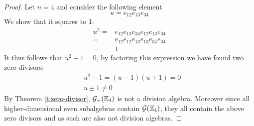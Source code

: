 \begin{proof}
	Let $n = 4$ and consider the following element
	\[u = e_{12}e_{13}e_{34}\]
	We show that it squares to $1$:
	\begin{align*}
		u^2 = &e_{12}e_{13}e_{34}e_{12}e_{13}e_{34}\\
			= &e_{12}e_{12}e_{13}e_{13}e_{34}e_{34}\\
			= &1
	\end{align*}
	It thus follows that $u^2 - 1 = 0$, by factoring this expression we have found two zero-divisors:
	\begin{align*}
		&u^2 - 1 = (u-1)(u+1) = 0 \\
		&u \pm 1 \neq 0
	\end{align*}
	By Theorem \ref{t:zero-divisor}, $\mathcal{G}_+(\mathbb{E}_4)$ is not a division algebra. Moreover since all higher-dimensional even subalgebras contain $\mathcal{G}(\mathbb{E}_4)$, they all contain the above zero divisors and as such are also not division algebras.
\end{proof}
